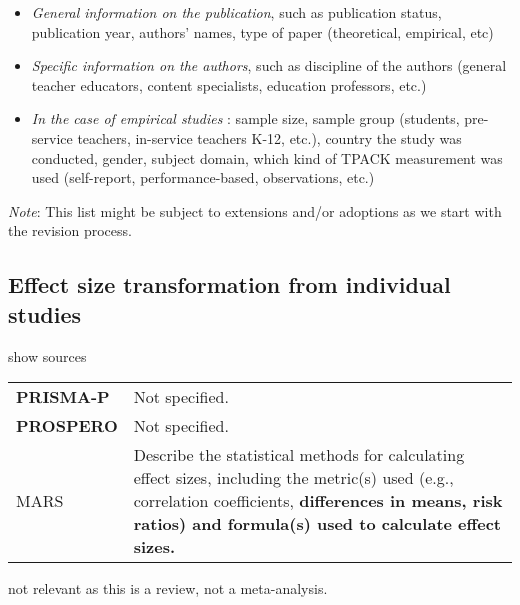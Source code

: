 \documentclass[
]{article}
\providecommand{\tightlist}{%
  \setlength{\itemsep}{0pt}\setlength{\parskip}{0pt}}
\begin{document}
\begin{itemize}
\tightlist
\item
  \emph{General information on the publication}, such as publication
  status, publication year, authors' names, type of paper (theoretical,
  empirical, etc)
\item
  \emph{Specific information on the authors}, such as discipline of the
  authors (general teacher educators, content specialists, education
  professors, etc.)
\item
  \emph{In the case of empirical studies} : sample size, sample group
  (students, pre-service teachers, in-service teachers K-12, etc.),
  country the study was conducted, gender, subject domain, which kind of
  TPACK measurement was used (self-report, performance-based,
  observations, etc.)
\end{itemize}

\emph{Note}: This list might be subject to extensions and/or adoptions
as we start with the revision process.

\hypertarget{effect-size-transformation-from-individual-studies}{%
\subsection{Effect size transformation from individual
studies}\label{effect-size-transformation-from-individual-studies}}

show sources

\hypertarget{estfis}{}
\begin{collapse}

\begin{table}[H]
\centering
\begin{tabular}{>{}l|l}
\hline
\cellcolor[HTML]{ececec}{source} & \cellcolor[HTML]{ececec}{description}\\
\hline
\textbf{PRISMA-P} & Not specified.\\
\hline
\textbf{PROSPERO} & Not specified.\\
\hline
MARS & Describe the statistical methods for calculating effect sizes, including the metric(s) used (e.g., correlation coefficients,
\textbf{differences in means, risk ratios) and formula(s) used to calculate effect sizes.}\\
\hline
\end{tabular}
\end{table}

\end{collapse}

not relevant as this is a review, not a meta-analysis.
\end{document}
